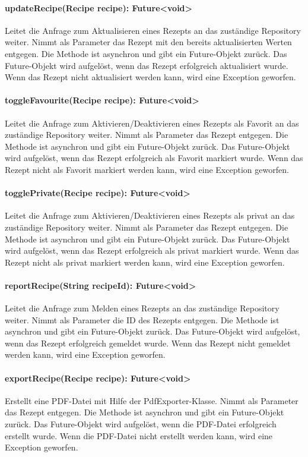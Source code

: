 \documentclass[parskip=full]{scrartcl}
\begin{document}
\paragraph{updateRecipe(Recipe recipe): Future<void>}
Leitet die Anfrage zum Aktualisieren eines Rezepts an das zuständige Repository weiter. Nimmt als Parameter das Rezept mit den bereits aktualisierten Werten entgegen. Die Methode ist asynchron und gibt ein Future-Objekt zurück. Das Future-Objekt wird aufgelöst, wenn das Rezept erfolgreich aktualisiert wurde. Wenn das Rezept nicht aktualisiert werden kann, wird eine Exception geworfen.
\paragraph{toggleFavourite(Recipe recipe): Future<void>}
Leitet die Anfrage zum Aktivieren/Deaktivieren eines Rezepts als Favorit an das zuständige Repository weiter. Nimmt als Parameter das Rezept entgegen. Die Methode ist asynchron und gibt ein Future-Objekt zurück. Das Future-Objekt wird aufgelöst, wenn das Rezept erfolgreich als Favorit markiert wurde. Wenn das Rezept nicht als Favorit markiert werden kann, wird eine Exception geworfen.
\paragraph{togglePrivate(Recipe recipe): Future<void>}
Leitet die Anfrage zum Aktivieren/Deaktivieren eines Rezepts als privat an das zuständige Repository weiter. Nimmt als Parameter das Rezept entgegen. Die Methode ist asynchron und gibt ein Future-Objekt zurück. Das Future-Objekt wird aufgelöst, wenn das Rezept erfolgreich als privat markiert wurde. Wenn das Rezept nicht als privat markiert werden kann, wird eine Exception geworfen.
\paragraph{reportRecipe(String recipeId): Future<void>}
Leitet die Anfrage zum Melden eines Rezepts an das zuständige Repository weiter. Nimmt als Parameter die ID des Rezepts entgegen. Die Methode ist asynchron und gibt ein Future-Objekt zurück. Das Future-Objekt wird aufgelöst, wenn das Rezept erfolgreich gemeldet wurde. Wenn das Rezept nicht gemeldet werden kann, wird eine Exception geworfen.
\paragraph{exportRecipe(Recipe recipe): Future<void>}
Erstellt eine PDF-Datei mit Hilfe der PdfExporter-Klasse. Nimmt als Parameter das Rezept entgegen. Die Methode ist asynchron und gibt ein Future-Objekt zurück. Das Future-Objekt wird aufgelöst, wenn die PDF-Datei erfolgreich erstellt wurde. Wenn die PDF-Datei nicht erstellt werden kann, wird eine Exception geworfen.
\newpage
\end{document}
